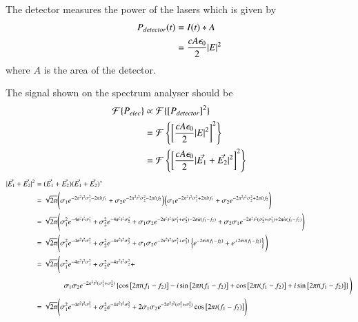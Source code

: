 The detector measures the power of the lasers which is given by
\begin{align}
P_{detector}(t) &= I(t) * A\notag\\
&= \frac{cA\epsilon_0}{2}|E|^2
\end{align}
where $A$ is the area of the detector.

The signal shown on the spectrum analyser should be
\begin{align}
\mathcal{F}\{P_{elec}\} &\propto \mathcal{F}\{\left[P_{detector}\right]^2\}\notag\\
&= \mathcal{F}\left\{\left[\frac{cA\epsilon_0}{2}|E|^2\right]^2\right\}\notag\\
&= \mathcal{F}\left\{\left[\frac{cA\epsilon_0}{2}|\vec{E_1}+\vec{E_2}|^2\right]^2\right\}
\end{align}
\begin{align}
|\vec{E_1}+\vec{E_2}|^2 &= (\vec{E_1}+\vec{E_2})(\vec{E_1}+\vec{E_2})^*\notag\\
&= \sqrt{2\pi} \Bigg(\sigma_1 e^{-2\pi^2t^2\sigma_1^2-2\pi i t f_1} + \sigma_2 e^{-2\pi^2t^2\sigma_2^2-2\pi i t f_2}\Big)\Big(\sigma_1 e^{-2\pi^2t^2\sigma_1^2+2\pi i t f_1} + \sigma_2 e^{-2\pi^2t^2\sigma_2^2+2\pi i t f_2}\Bigg)\notag\\
&= \sqrt{2\pi}\Bigg(\sigma_1^2 e^{-4\pi^2t^2\sigma_1^2} + \sigma_2^2 e^{-4\pi^2t^2\sigma_2^2} + \sigma_1\sigma_2 e^{-2\pi^2t^2(\sigma_1^2+\sigma_2^2)-2\pi i t (f_1-f_2)} + \sigma_2\sigma_1 e^{-2\pi^2t^2(\sigma_2^2+\sigma_1^2)+2\pi i t (f_1-f_2)} \Bigg)\notag\\
&= \sqrt{2\pi}\Bigg(\sigma_1^2 e^{-4\pi^2t^2\sigma_1^2} + \sigma_2^2 e^{-4\pi^2t^2\sigma_2^2} + \sigma_1\sigma_2 e^{-2\pi^2t^2(\sigma_1^2+\sigma_2^2)}\left\{e^{-2\pi i t (f_1-f_2)} + e^{+2\pi i t (f_1-f_2)} \right\}\Bigg)\notag\\
&= \sqrt{2\pi}\Bigg(\sigma_1^2 e^{-4\pi^2t^2\sigma_1^2} + \sigma_2^2 e^{-4\pi^2t^2\sigma_2^2} + \notag\\&\quad\quad\quad\quad\sigma_1\sigma_2 e^{-2\pi^2t^2(\sigma_1^2+\sigma_2^2)}\left\{\cos\big[2\pi t (f_1-f_2)\big]-i\sin\big[2\pi t (f_1-f_2)\big] + \cos\big[2\pi t (f_1-f_2)\big]+i\sin\big[2\pi t (f_1-f_2)\big]\right\} \Bigg)\notag\\
&= \sqrt{2\pi}\Bigg(\sigma_1^2 e^{-4\pi^2t^2\sigma_1^2} + \sigma_2^2 e^{-4\pi^2t^2\sigma_2^2} + 2\sigma_1\sigma_2 e^{-2\pi^2t^2(\sigma_1^2+\sigma_2^2)}\cos\big[2\pi t (f_1-f_2)\big] \Bigg)
\end{align}
